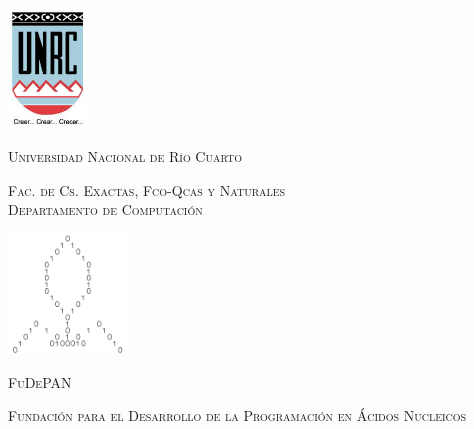\documentclass[a4paper,12pt,english]{report}
\theoremstyle{definition}
\begin{document}
\begin{titlepage}
    \begin{center}

        \begin{minipage}{0.45\textwidth}
            \begin{center}
                \includegraphics[width=60pt,height=90.5pt]{images/escudo_unrc.png}\\
                \begin{scriptsize}
                    \textsc{Universidad Nacional de R\'io Cuarto} \\
                \end{scriptsize}
                \vfill
                \begin{tiny}
                    \textsc{Fac. de Cs. Exactas, Fco-Qcas y Naturales} \\
                    \textsc{Departamento de Computaci\'on} \\[1cm]    
                \end{tiny}
            \end{center}
        \end{minipage}
        \begin{minipage}{0.45\textwidth}
            \begin{center}
                \includegraphics[width=90pt,height=90pt]{images/fudepan.png}\\
                \vfill
                \begin{scriptsize}
                    \textsc{FuDePAN} \\
                \end{scriptsize}
                \begin{tiny}
                    \textsc{Fundaci\'on para el Desarrollo de la Programaci\'on en \'Acidos Nucleicos} \\[1cm]    
                \end{tiny}
            \end{center}
        \end{minipage}


\end{center}
\end{titlepage}
\end{document}
